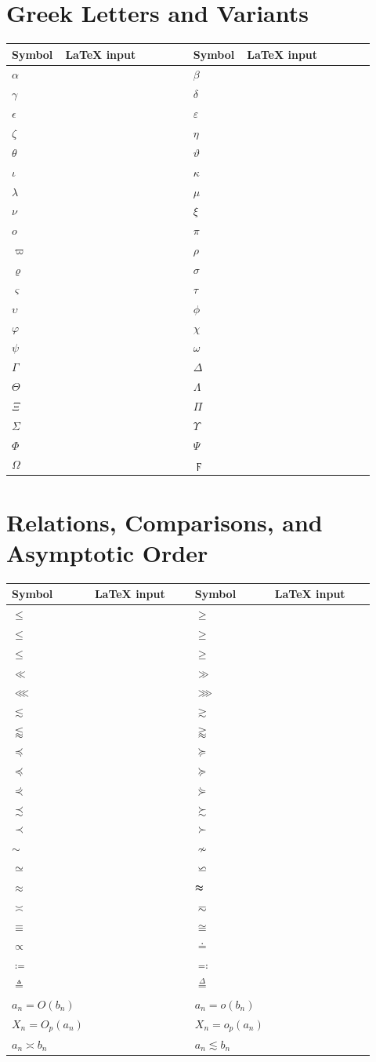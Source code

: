 \documentclass[10pt]{article}
\newcommand{\code}[1]{\texttt{\detokenize{#1}}}
\newcommand{\srow}[4]{$#1$ & \code{#2} & $#3$ & \code{#4}\\}
\newenvironment{symtable}
{\small\begin{longtable}{
  >{\centering\arraybackslash}p{0.12\linewidth}
  >{\raggedright\arraybackslash}p{0.34\linewidth}
  >{\centering\arraybackslash}p{0.12\linewidth}
  >{\raggedright\arraybackslash}p{0.34\linewidth}}
  \toprule
  \textbf{Symbol} & \textbf{LaTeX input} &
  \textbf{Symbol} & \textbf{LaTeX input}\\
  \midrule
  \endhead}
{\bottomrule\end{longtable}}
\begin{document}
\section*{Greek Letters and Variants}

\begin{symtable}
\srow{\alpha}{\alpha}{\beta}{\beta}
\srow{\gamma}{\gamma}{\delta}{\delta}
\srow{\epsilon}{\epsilon}{\varepsilon}{\varepsilon}
\srow{\zeta}{\zeta}{\eta}{\eta}
\srow{\theta}{\theta}{\vartheta}{\vartheta}
\srow{\iota}{\iota}{\kappa}{\kappa}
\srow{\lambda}{\lambda}{\mu}{\mu}
\srow{\nu}{\nu}{\xi}{\xi}
\srow{o}{o}{\pi}{\pi}
\srow{\varpi}{\varpi}{\rho}{\rho}
\srow{\varrho}{\varrho}{\sigma}{\sigma}
\srow{\varsigma}{\varsigma}{\tau}{\tau}
\srow{\upsilon}{\upsilon}{\phi}{\phi}
\srow{\varphi}{\varphi}{\chi}{\chi}
\srow{\psi}{\psi}{\omega}{\omega}
\srow{\Gamma}{\Gamma}{\Delta}{\Delta}
\srow{\Theta}{\Theta}{\Lambda}{\Lambda}
\srow{\Xi}{\Xi}{\Pi}{\Pi}
\srow{\Sigma}{\Sigma}{\Upsilon}{\Upsilon}
\srow{\Phi}{\Phi}{\Psi}{\Psi}
\srow{\Omega}{\Omega}{\digamma}{\digamma}
\end{symtable}

\section*{Relations, Comparisons, and Asymptotic Order}

\begin{symtable}
\srow{\le}{\le}{\ge}{\ge}
\srow{\leq}{\leq}{\geq}{\geq}
\srow{\leqslant}{\leqslant}{\geqslant}{\geqslant}
\srow{\ll}{\ll}{\gg}{\gg}
\srow{\lll}{\lll}{\ggg}{\ggg}
\srow{\lesssim}{\lesssim}{\gtrsim}{\gtrsim}
\srow{\lessapprox}{\lessapprox}{\gtrapprox}{\gtrapprox}
\srow{\preceq}{\preceq}{\succeq}{\succeq}
\srow{\preccurlyeq}{\preccurlyeq}{\succcurlyeq}{\succcurlyeq}
\srow{\curlyeqprec}{\curlyeqprec}{\curlyeqsucc}{\curlyeqsucc}
\srow{\precsim}{\precsim}{\succsim}{\succsim}
\srow{\prec}{\prec}{\succ}{\succ}
\srow{\sim}{\sim}{\nsim}{\nsim}
\srow{\simeq}{\simeq}{\backsimeq}{\backsimeq}
\srow{\approx}{\approx}{\thickapprox}{\thickapprox}
\srow{\asymp}{\asymp}{\eqsim}{\eqsim}
\srow{\equiv}{\equiv}{\cong}{\cong}
\srow{\propto}{\propto}{\doteq}{\doteq}
\srow{\coloneqq}{\coloneqq}{\eqqcolon}{\eqqcolon}
\srow{\triangleq}{\triangleq}{\overset{\Delta}{=}}{\overset{\Delta}{=}}
\srow{a_n = O(b_n)}{a_n = O(b_n)}{a_n = o(b_n)}{a_n = o(b_n)}
\srow{X_n = O_p(a_n)}{X_n = O_p(a_n)}{X_n = o_p(a_n)}{X_n = o_p(a_n)}
\srow{a_n \asymp b_n}{a_n \asymp b_n}{a_n \lesssim b_n}{a_n \lesssim b_n}
\end{symtable}
\end{document}
